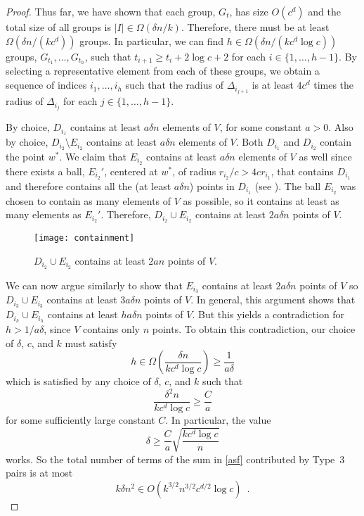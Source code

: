 \documentclass{patmorin}
\begin{document}
\begin{proof}
  Thus far, we have shown that each group, $G_t$, has size $O(c^d)$
  and the total size of all groups is $|I|\in\Omega(\delta n/k)$.
  Therefore, there must be at least $\Omega(\delta n/(kc^d))$ groups.
  In particular, we can find $h\in\Omega(\delta n/(kc^d\log c))$ groups,
  $G_{t_1},\ldots,G_{t_h}$, such that $t_{i+1} \ge t_{i}+2\log c+2$ for
  each $i\in\{1,\ldots,h-1\}$.  By selecting a representative element from
  each of these groups, we obtain a sequence of indices $i_1,\ldots,i_h$
  such that the radius of $\Delta_{i_{j+1}}$ is at least $4c^d$ times
  the radius of $\Delta_{i_j}$ for each $j\in\{1,\ldots,h-1\}$.

  By choice, $D_{i_1}$ contains at least $ a \delta n$ elements of
  $V$, for some constant $ a  >0$.  Also by choice, $D_{i_2}\setminus
  E_{i_2}$ contains at least $ a \delta n$ elements of $V$.
  Both $D_{i_1}$ and $D_{i_2}$ contain the point $w^*$.  We claim
  that $E_{i_2}$ contains at least $ a \delta n$ elements of $V$
  as well since there exists a ball, $E_{i_2}'$, centered at $w^*$,
  of radius $r_{i_2}/c > 4cr_{i_1}$, that contains $D_{i_1}$ and
  therefore contains all the (at least $ a\delta n$) points in $D_{i_1}$
  (see ).  The ball $E_{i_2}$ was chosen to contain
  as many elements of $V$ as possible, so it contains at least as many
  elements as $E_{i_2}'$.  Therefore, $D_{i_2}\cup E_{i_2}$ contains at
  least $2 a  \delta n$ points of $V$.

  \begin{figure}
     \begin{center}
       \texttt{[image: containment]}
     \end{center}
     \caption{$D_{i_2}\cup E_{i_2}$ contains at least $2 a  n$ 
              points of $V$.}
   \end{figure}

  We can now argue similarly to show that $E_{i_3}$ contains at
  least $2 a \delta n$ points of $V$ so $D_{i_3}\cup E_{i_3}$
  contains at least $3 a \delta n$ points of $V$.  In general,
  this argument shows that $D_{i_h}\cup E_{i_h}$ contains at least
  $h a \delta n$ points of $V$.  But this yields a contradiction for
  $h> 1/ a \delta$, since $V$ contains only $n$ points.  To obtain
  this contradiction, our choice of $\delta$, $c$, and $k$ must satisfy
  \[
       h\in\Omega\left(\frac{\delta n}{kc^d\log c}\right) \ge
          \frac{1}{ a  \delta}
  \]
  which is satisfied by any choice of $\delta$, $c$, and $k$ such that
  \[
       \frac{\delta^2 n}{kc^d\log c} \ge \frac{C}{a}
  \]
  for some sufficiently large constant $C$.  In particular, the value
  \[
       \delta \ge \frac{C}{a}\sqrt{\frac{kc^d\log c}{n}}
  \]
  works.  So the total number of terms of the sum in \eqref{asf}
  contributed by Type~3 pairs is at most
  \[
    k\delta n^2 \in O(k^{3/2}n^{3/2}c^{d/2}\log c) \enspace .
  \]


\end{proof}
\end{document}

